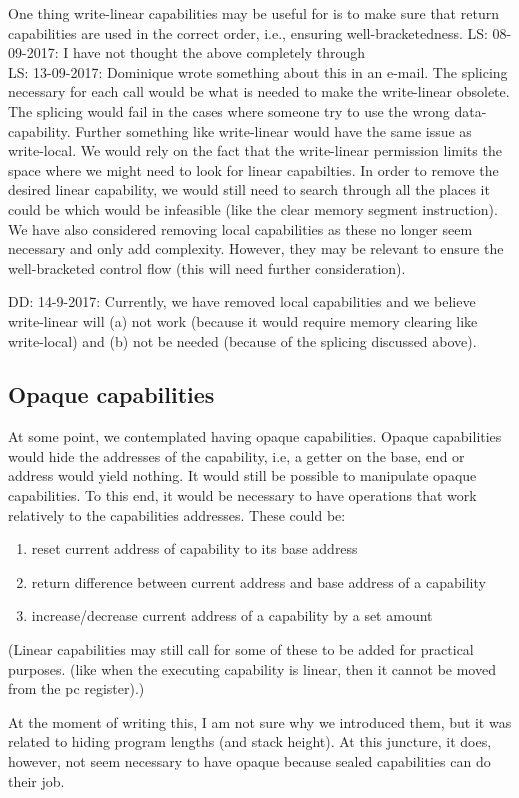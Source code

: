 \documentclass[a4paper]{article}
\newcommand\lau[1]{{\color{purple} \sf \footnotesize {LS: #1}}\\}
\newcommand\dominique[1]{{\color{purple} \sf \footnotesize {DD: #1}}\\}
\begin{document}
One thing write-linear capabilities may be useful for is to make sure that return capabilities are used in the correct order, i.e., ensuring well-bracketedness. 
\lau{08-09-2017: I have not thought the above completely through} 
\lau{13-09-2017: Dominique wrote something about this in an e-mail. The splicing necessary for each call would be what is needed to make the write-linear obsolete. The splicing would fail in the cases where someone try to use the wrong data-capability. Further something like write-linear would have the same issue as write-local. We would rely on the fact that the write-linear permission limits the space where we might need to look for linear capabilties. In order to remove the desired linear capability, we would still need to search through all the places it could be which would be infeasible (like the clear memory segment instruction).}

We have also considered removing local capabilities as these no longer seem necessary and only add complexity. However, they may be relevant to ensure the well-bracketed control flow (this will need further consideration).

\dominique{14-9-2017: Currently, we have removed local capabilities and we believe write-linear will (a) not work (because it would require memory clearing like write-local) and (b) not be needed (because of the splicing discussed above).}


\subsection{Opaque capabilities}
At some point, we contemplated having opaque capabilities. Opaque capabilities would hide the addresses of the capability, i.e, a getter on the base, end or address would yield nothing. It would still be possible to manipulate opaque capabilities. To this end, it would be necessary to have operations that work relatively to the capabilities addresses. These could be: 
\begin{enumerate}
\item reset current address of capability to its base address
\item return difference between current address and base address of a capability
\item increase/decrease current address of a capability by a set amount
\end{enumerate}
(Linear capabilities may still call for some of these to be added for practical purposes. (like when the executing capability is linear, then it cannot be moved from the pc register).)

At the moment of writing this, I am not sure why we introduced them, but it was related to hiding program lengths (and stack height).
At this juncture, it does, however, not seem necessary to have opaque because sealed capabilities can do their job.
\end{document}
